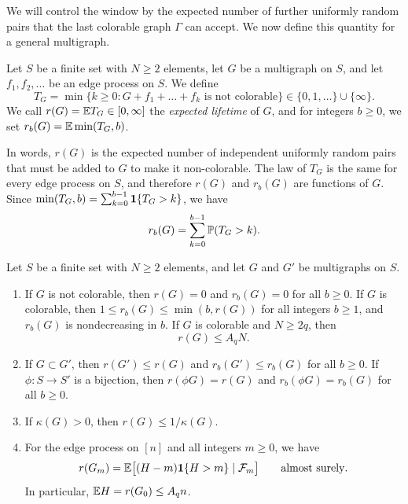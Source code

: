 We will control the window by the expected number of further uniformly random pairs that the last colorable graph $\Gamma$ can accept. We now define this quantity for a general multigraph.

\begin{definition}\label{def:pre-lifetime}
Let $S$ be a finite set with $N \ge 2$ elements, let $G$ be a multigraph on $S$, and let $f_1, f_2, \dots$ be an edge process on $S$. We define
\begin{equation}\label{eq:pre-T}
T_G = \min\{k \ge 0 : G + f_1 + \dots + f_k \text{ is not colorable}\} \in \{0, 1, \dots\} \cup \{\infty\}.
\end{equation}
We call $r(G) = \mathbb E T_G \in [0, \infty]$ the \emph{expected lifetime} of $G$, and for integers $b \ge 0$, we set $r_b(G) = \mathbb E \min(T_G, b)$.
\end{definition}

In words, $r(G)$ is the expected number of independent uniformly random pairs that must be added to $G$ to make it non-colorable. The law of $T_G$ is the same for every edge process on $S$, and therefore $r(G)$ and $r_b(G)$ are functions of $G$. Since $\min(T_G, b) = \sum_{k = 0}^{b - 1} \mathbf 1\{T_G > k\}$, we have
\begin{equation}\label{eq:pre-rb}
r_b(G) = \sum_{k = 0}^{b - 1} \mathbb P(T_G > k).
\end{equation}

\begin{lemma}\label{lem:pre-lifetime}
Let $S$ be a finite set with $N \ge 2$ elements, and let $G$ and $G'$ be multigraphs on $S$.
\begin{enumerate}[label=(\alph*)]
\item If $G$ is not colorable, then $r(G) = 0$ and $r_b(G) = 0$ for all $b \ge 0$. If $G$ is colorable, then $1 \le r_b(G) \le \min(b, r(G))$ for all integers $b \ge 1$, and $r_b(G)$ is nondecreasing in $b$. If $G$ is colorable and $N \ge 2q$, then
\begin{equation}\label{eq:pre-Aq}
r(G) \le A_q N.
\end{equation}
\item If $G \subset G'$, then $r(G') \le r(G)$ and $r_b(G') \le r_b(G)$ for all $b \ge 0$. If $\phi \colon S \to S'$ is a bijection, then $r(\phi G) = r(G)$ and $r_b(\phi G) = r_b(G)$ for all $b \ge 0$.
\item If $\kappa(G) > 0$, then $r(G) \le 1/\kappa(G)$.
\item For the edge process on $[n]$ and all integers $m \ge 0$, we have
\begin{equation}\label{eq:pre-r-conditional}
r(G_m) = \mathbb E\big[(H - m) \mathbf 1\{H > m\} \mid \mathcal F_m\big] \qquad \text{almost surely}.
\end{equation}
In particular, $\mathbb E H = r(G_0) \le A_q n$.
\end{enumerate}
\end{lemma}

